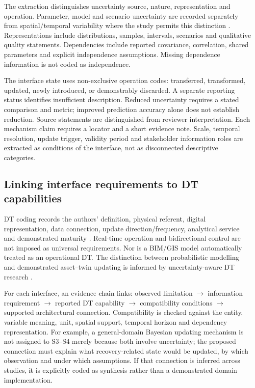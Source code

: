 The extraction distinguishes uncertainty source, nature, representation and operation. Parameter, model and scenario uncertainty are recorded separately from spatial/temporal variability where the study permits this distinction \citep{I25}. Representations include distributions, samples, intervals, scenarios and qualitative quality statements. Dependencies include reported covariance, correlation, shared parameters and explicit independence assumptions. Missing dependence information is not coded as independence.

The interface state uses non-exclusive operation codes: transferred, transformed, updated, newly introduced, or demonstrably discarded. A separate reporting status identifies insufficient description. Reduced uncertainty requires a stated comparison and metric; improved prediction accuracy alone does not establish reduction. Source statements are distinguished from reviewer interpretation. Each mechanism claim requires a locator and a short evidence note. Scale, temporal resolution, update trigger, validity period and stakeholder information roles are extracted as conditions of the interface, not as disconnected descriptive categories.

\subsection{Linking interface requirements to DT capabilities}

DT coding records the authors' definition, physical referent, digital representation, data connection, update direction/frequency, analytical service and demonstrated maturity \citep{I27,I26,I31}. Real-time operation and bidirectional control are not imposed as universal requirements. Nor is a BIM/GIS model automatically treated as an operational DT. The distinction between probabilistic modelling and demonstrated asset--twin updating is informed by uncertainty-aware DT research \citep{I33,I32}.

For each interface, an evidence chain links: observed limitation $\rightarrow$ information requirement $\rightarrow$ reported DT capability $\rightarrow$ compatibility conditions $\rightarrow$ supported architectural connection. Compatibility is checked against the entity, variable meaning, unit, spatial support, temporal horizon and dependency representation. For example, a general-domain Bayesian updating mechanism is not assigned to S3--S4 merely because both involve uncertainty; the proposed connection must explain what recovery-related state would be updated, by which observation and under which assumptions. If that connection is inferred across studies, it is explicitly coded as synthesis rather than a demonstrated domain implementation.

